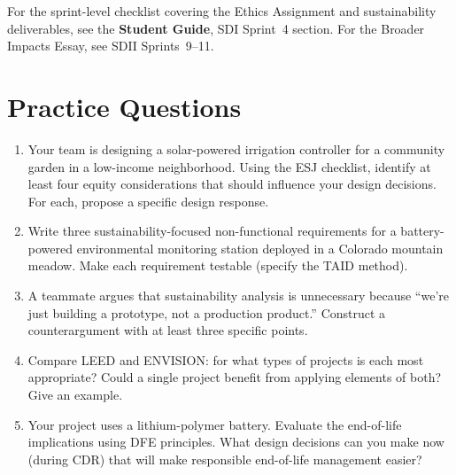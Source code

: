 \begin{tipbox}
For the sprint-level checklist covering the Ethics Assignment and sustainability deliverables, see the \textbf{Student Guide}, SDI Sprint~4 section. For the Broader Impacts Essay, see SDII Sprints~9--11.
\end{tipbox}

\section{Practice Questions}
\begin{enumerate}[leftmargin=1.5em]
\item Your team is designing a solar-powered irrigation controller for a community garden in a low-income neighborhood. Using the ESJ checklist, identify at least four equity considerations that should influence your design decisions. For each, propose a specific design response.
\item Write three sustainability-focused non-functional requirements for a battery-powered environmental monitoring station deployed in a Colorado mountain meadow. Make each requirement testable (specify the TAID method).
\item A teammate argues that sustainability analysis is unnecessary because ``we're just building a prototype, not a production product.'' Construct a counterargument with at least three specific points.
\item Compare LEED and ENVISION: for what types of projects is each most appropriate? Could a single project benefit from applying elements of both? Give an example.
\item Your project uses a lithium-polymer battery. Evaluate the end-of-life implications using DFE principles. What design decisions can you make now (during CDR) that will make responsible end-of-life management easier?
\end{enumerate}

